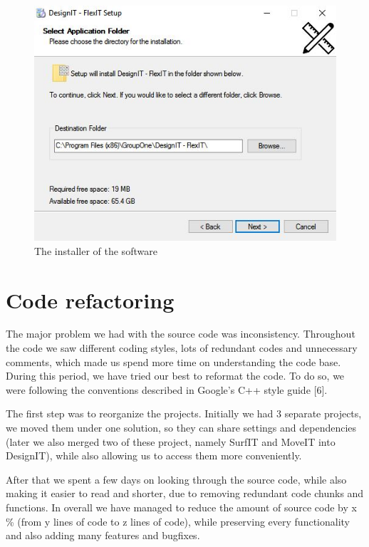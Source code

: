 \documentclass[a4paper, 11pt, article]{report}
\begin{document}
\begin{figure}[H]
\includegraphics[width=13cm]{images/setup}
\caption{The installer of the software}
\centering
\end{figure}

\section{Code refactoring}

The major problem we had with the source code was inconsistency. Throughout the code we saw different coding styles, lots of redundant codes and unnecessary comments, which made us spend more time on understanding the code base. During this period, we have tried our best to reformat the code. To do so, we were following the conventions described in Google's C++ style guide [6]. 

The first step was to reorganize the projects. Initially we had 3 separate projects, we moved them under one solution, so they can share settings and dependencies (later we also merged two of these project, namely SurfIT and MoveIT into DesignIT), while also allowing us to access them more conveniently.

After that we spent a few days on looking through the source code, while also making it easier to read and shorter, due to removing redundant code chunks and functions. In overall we have managed to reduce the amount of source code by x \% (from y lines of code to z lines of code), while preserving every functionality and also adding many features and bugfixes.

\end{document}
